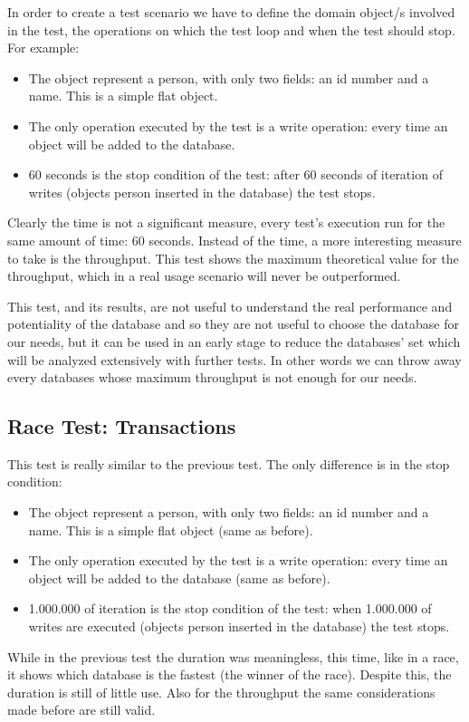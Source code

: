 In order to create a test scenario we have to define the domain object/s involved in the test, the operations on which the test loop and when the test should stop. For example:
\begin{itemize}
	\item The object represent a person, with only two fields: an id number and a name. This is a simple flat object. 
	\item The only operation executed by the test is a write operation: every time an object will be added to the database.
	\item 60 seconds is the stop condition of the test: after 60 seconds of iteration of writes (objects person inserted in the database) the test stops.
\end{itemize}
Clearly the time is not a significant measure, every test's execution run for the same amount of time: 60 seconds. Instead of the time, a more interesting measure to take is the throughput. This test shows the maximum theoretical value for the throughput, which in a real usage scenario will never be outperformed. 

This test, and its results, are not useful to understand the real performance and potentiality of the database and so they are not useful to choose the database for our needs, but it can be used in an early stage to reduce the databases' set which will be analyzed extensively with further tests. In other words we can throw away every databases whose maximum throughput is not enough for our needs.

		\subsection{Race Test: Transactions}
This test is really similar to the previous test. The only difference is in the stop condition:
\begin{itemize}
	\item The object represent a person, with only two fields: an id number and a name. This is a simple flat object (same as before). 
	\item The only operation executed by the test is a write operation: every time an object will be added to the database (same as before).
	\item 1.000.000 of iteration is the stop condition of the test: when 1.000.000 of writes are executed (objects person inserted in the database) the test stops.
\end{itemize}
While in the previous test the duration was meaningless, this time, like in a race, it shows which database is the fastest (the winner of the race). Despite this, the duration is still of little use. Also for the throughput the same considerations made before are still valid.


